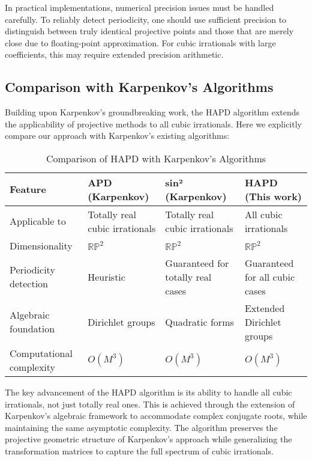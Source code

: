 \begin{remark}
In practical implementations, numerical precision issues must be handled carefully. To reliably detect periodicity, one should use sufficient precision to distinguish between truly identical projective points and those that are merely close due to floating-point approximation. For cubic irrationals with large coefficients, this may require extended precision arithmetic.
\end{remark}

\subsection{Comparison with Karpenkov's Algorithms}

Building upon Karpenkov's groundbreaking work, the HAPD algorithm extends the applicability of projective methods to all cubic irrationals. Here we explicitly compare our approach with Karpenkov's existing algorithms:

\begin{table}[h]
\centering
\caption{Comparison of HAPD with Karpenkov's Algorithms}
\label{tab:algorithm_comparison}
\begin{tabular}{|p{}|p{}|p{}|p{}|}
\hline
\textbf{Feature} & \textbf{APD (Karpenkov)} & \textbf{sin² (Karpenkov)} & \textbf{HAPD (This work)} \\
\hline
Applicable to & Totally real cubic irrationals & Totally real cubic irrationals & All cubic irrationals \\
\hline
Dimensionality & $\mathbb{RP}^2$ & $\mathbb{RP}^2$ & $\mathbb{RP}^2$ \\
\hline
Periodicity detection & Heuristic & Guaranteed for totally real cases & Guaranteed for all cubic cases \\
\hline
Algebraic foundation & Dirichlet groups & Quadratic forms & Extended Dirichlet groups \\
\hline
Computational complexity & $O(M^3)$ & $O(M^3)$ & $O(M^3)$ \\
\hline
\end{tabular}
\end{table}

The key advancement of the HAPD algorithm is its ability to handle all cubic irrationals, not just totally real ones. This is achieved through the extension of Karpenkov's algebraic framework to accommodate complex conjugate roots, while maintaining the same asymptotic complexity. The algorithm preserves the projective geometric structure of Karpenkov's approach while generalizing the transformation matrices to capture the full spectrum of cubic irrationals.

